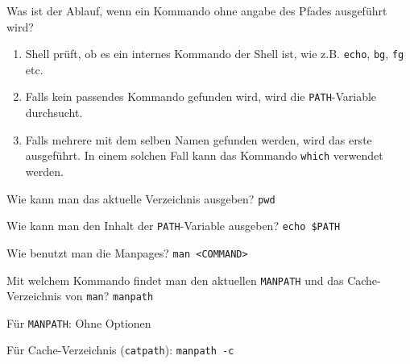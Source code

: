 \begin{flashcard}[Command]{Was ist der Ablauf, wenn ein Kommando ohne angabe des Pfades ausgeführt wird?}
	\begin{enumerate}
		\item Shell prüft, ob es ein internes Kommando der Shell ist, wie z.B. \texttt{echo}, \texttt{bg}, \texttt{fg} etc.
		
		\item Falls kein passendes Kommando gefunden wird, wird die \texttt{PATH}-Variable durchsucht.
		
		\item Falls mehrere mit dem selben Namen gefunden werden, wird das erste ausgeführt. In einem solchen Fall kann das Kommando \texttt{which} verwendet werden.
	\end{enumerate}
	
	
	
\end{flashcard}


\begin{flashcard}[Command]{Wie kann man das aktuelle Verzeichnis ausgeben?}
	\texttt{pwd}
	
	
\end{flashcard}

\begin{flashcard}[Command]{Wie kann man den Inhalt der \texttt{PATH}-Variable ausgeben?}
	\texttt{echo \$PATH}
	
	
\end{flashcard}

\begin{flashcard}[Command]{Wie benutzt man die Manpages?}
	\texttt{man <COMMAND>}
	
	
\end{flashcard}

\begin{flashcard}[Command]{Mit welchem Kommando findet man den aktuellen \texttt{MANPATH} und das Cache-Verzeichnis von \texttt{man}?}
	\texttt{manpath}
	
	\begin{description}
		\item Für \texttt{MANPATH}: Ohne Optionen
		
		\item Für Cache-Verzeichnis (\texttt{catpath}):  \texttt{manpath -c}
	\end{description}
\end{flashcard}

